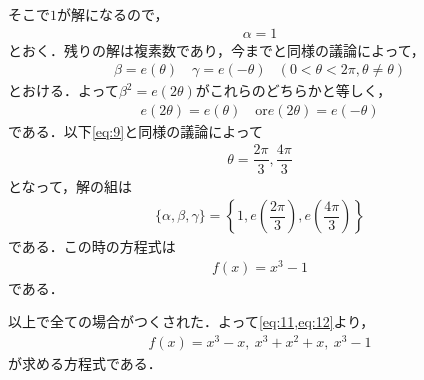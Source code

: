 \documentclass[../../main.tex]{subfiles}
\begin{document}
そこで$1$が解になるので，
\begin{align}
  \alpha = 1
\end{align}
とおく．残りの解は複素数であり，今までと同様の議論によって，
\begin{align}
  \beta = e(\theta) \quad \gamma = e(-\theta) & (0< \theta < 2\pi, \theta \neq \theta)
\end{align}
とおける．よって$\beta^2=e(2\theta)$がこれらのどちらかと等しく，
\begin{align}
  e(2\theta) = e(\theta) \quad \text{or} e(2\theta) = e(-\theta)
\end{align}
である．以下\cref{eq:9}と同様の議論によって
\begin{align}
  \theta = \dfrac{2\pi}{3}, \dfrac{4\pi}{3}
\end{align}
となって，解の組は
\begin{align}
  \{\alpha,\beta,\gamma\} = \left\{1,e\left(\dfrac{2\pi}{3}\right), e\left(\dfrac{4\pi}{3}\right)\right\}
\end{align}
である．この時の方程式は
\begin{align}
  f(x) = x^3-1 \label{eq:12}
\end{align}
である．
\casesend

以上で全ての場合がつくされた．よって\cref{eq:11,eq:12}より，
\begin{align}
  f(x)=x^3-x,\ x^3+x^2+x,\ x^3-1
\end{align}
が求める方程式である．

\newpage
\end{document}
